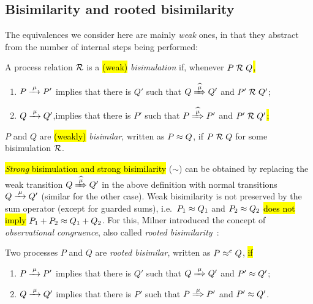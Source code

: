 \subsection{Bisimilarity and rooted bisimilarity}
\label{ss:BiEx}

The equivalences we consider here are mainly \emph{weak} ones, in that they
abstract from the number of internal steps being performed:
\begin{definition}%
\label{d:wb}
A process relation ${{\cal R}}$ is a \hl{(weak)} \emph{bisimulation} if, whenever
 $P\mathrel{\cal R} Q$\hl{,} %
\begin{enumerate}
\item $P \arr\mu P'$ implies that there is $Q'$ such that $Q \Arcap \mu Q'$ and $P' \mathrel{\cal R} Q'$;
\item $Q \arr\mu Q'$,implies that there is $P'$ such that $P \Arcap
  \mu P'$ and $P' \mathrel{\cal R} Q'$\hl{;}
\end{enumerate}
 $P$ and $Q$ are \hl{(weakly)} \emph{bisimilar},
written as $P \approx Q$, if $P \mathrel{\cal R} Q$ for some bisimulation ${\cal R}$.
\end{definition}

\hl{\emph{Strong} bisimulation and strong bisimilarity} ($\sim$)
can be obtained by replacing the weak transition $Q\Arcap\mu Q'$ in the above
definition with normal transitions $Q \arr \mu Q'$ (similar for the other case).
Weak bisimilarity is not preserved by the sum operator (except for
guarded sums), i.e.\  $P_1 \approx Q_1$ and $P_2 \approx Q_2$  \hl{does not imply}
 $P_1 + P_2 \approx Q_1 + Q_2$.
For this, Milner introduced the concept of \emph{observational congruence}, also called \emph{rooted
  bisimilarity}~\cite{Gorrieri:2015jt,Sangiorgi:2011ut}:
\begin{definition}%
\label{d:rootedBisimilarity}
Two processes $P$ and $Q$ are \emph{rooted bisimilar}, written as $P
\mathrel{\approx^{\rm{c}}} Q$, \hl{if} %
\begin{enumerate}
 \item  $P \arr\mu P'$ implies that there is $Q'$ such that $Q
   \Arr\mu Q'$ and $P' \approx Q'$;
 \item  $Q \arr\mu Q'$ implies that there is $P'$ such that $P
   \Arr\mu P'$ and $P' \approx Q'$\enspace.
\end{enumerate}
\end{definition}

